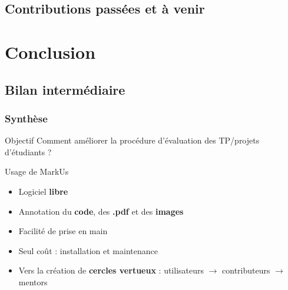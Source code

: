 \documentclass[svgnames,hyperref, english, xcolor=dvipsnames,usenames]{beamer}		        %
\begin{document}


\subsection*{Contributions passées et à venir}

\section{Conclusion}

\subsection*{Bilan intermédiaire}

\frame
{
        \frametitle{Synthèse}

        \begin{alertblock}{Objectif}
                Comment améliorer la procédure d'évaluation des TP/projets d'étudiants ?
        \end{alertblock}

        \begin{block}{Usage de MarkUs}

                \begin{itemize}
                        \item Logiciel \textbf{libre}
                        \item Annotation du \textbf{code}, des \textbf{.pdf} et des \textbf{images}
                        \item Facilité de prise en main
                        \item Seul coût : installation et maintenance
                        \item Vers la création de \textbf{cercles vertueux} : utilisateurs $\rightarrow$ contributeurs $\rightarrow$ mentors
                \end{itemize}
        \end{block}
}
\end{document}
